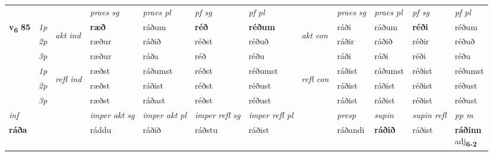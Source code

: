 \begin{longtable}[l]{X>{\footnotesize\itshape}llXXXXlXXXX}
 & &   & \textit{praes sg}  & \textit{praes pl}    & \textit{ pf sg} & \textit{pf pl} & & \textit{praes sg}  & \textit{praes pl}    & \textit{pf sg} & \textit{pf pl }  \\ \cmidrule{4-7} \cmidrule{9-12}
 \multirow{2}{*}{{{\textbf{v{\textsubscript{6}}} \Large{\textbf{85}}}}}  & 1p & \multirow{3}{*}{\begin{turn}{90}\textit{akt ind}\end{turn}} & \textbf{ræð} & ráðum & \textbf{réð} & \textbf{réðum} & \multirow{3}{*}{\begin{turn}{90}\textit{akt con}\end{turn}} &ráði & ráðum & \textbf{réði} & réðum\\*
 & 2p &  &  ræður  & ráðið & réðst & réðuð & & ráðir & ráðið & réðir & réðuð \\*
 & 3p &  & ræður & ráða & réð & réðu & & ráði & ráði& réði & réðu \\*
\cmidrule{4-7} \cmidrule{9-12}
 & 1p & \multirow{3}{*}{\begin{turn}{90}\textit{refl ind}\end{turn}}  & ræðst & ráðumst & réðst & réðumst & \multirow{3}{*}{\begin{turn}{90}\textit{refl con}\end{turn}}  &ráðist & ráðumst & réðist & réðumst \\*
 & 2p &  & ræðst & ráðist & réðst & réðust & &ráðist & ráðist & réðist & réðust \\*
 & 3p  & & ræðst & ráðast & réðst & réðust & & ráðist & ráðist& réðist & réðust \\*
\cmidrule{4-7} \cmidrule{9-12}

   {\textit{inf}} & &  & \textit{imper akt sg} & \textit{imper akt pl} & \textit{imper refl sg} & \textit{imper refl pl} && \textit{presp} & \textit{supin} & \textit{supin refl} & \textit{pp m} \\*
  {\textbf{ráða}} & && ráddu  & ráðið & ráðstu & ráðist && ráðandi &  \textbf{ráðið} & ráðist & \specialcell{\textbf{ráðinn} \\ adj\textbf{\textsubscript{6-2}}} \\*

\midrule


\end{longtable}
